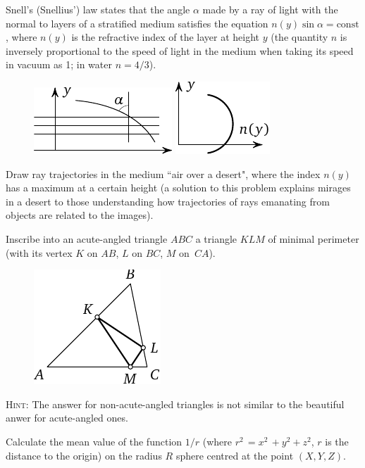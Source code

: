 \documentclass[12pt]{article}  %
\begin{document}
\bigskip
{} Snell's (Snellius') law states that the angle $\alpha$ made by a ray of light with the normal to layers of a stratified medium satisfies the equation $n(y) \sin \alpha=\text{const}$,
where $n(y)$ is the refractive index of the layer at height $y$ (the quantity $n$ is 
inversely proportional to the speed 
of light in the medium when taking its speed in vacuum as 1; in water $n=4/3$).
\begin{figure}[h]
\centering
\includegraphics{taskbook-47}\hskip2cm
\includegraphics{taskbook-471}
\end{figure}

Draw ray trajectories in the medium  ``air over a desert", where the index $n(y)$ has a maximum
at a certain height
(a solution to this problem explains mirages in a desert to those understanding how trajectories of rays emanating from objects are related to the images).

\newpage
{} Inscribe into an acute-angled triangle $ABC$ a triangle $KLM$ of minimal perimeter
(with its vertex $K$ on $AB$, $L$ on $BC$, $M$ on~$CA$).
\begin{figure}[h]
\centering
\includegraphics{taskbook-48} 
\end{figure}

\textsc{Hint:} The answer for non-acute-angled triangles is not similar to the beautiful anwer for acute-angled ones.


\bigskip
{} Calculate the mean value of the function  $1/r$ (where
$r^2\,=x^2\,+y^2+z^2$, $r$ is the distance to the origin) on the radius 
$R$ sphere centred at the point $(X,Y,Z)$.
\end{document}

